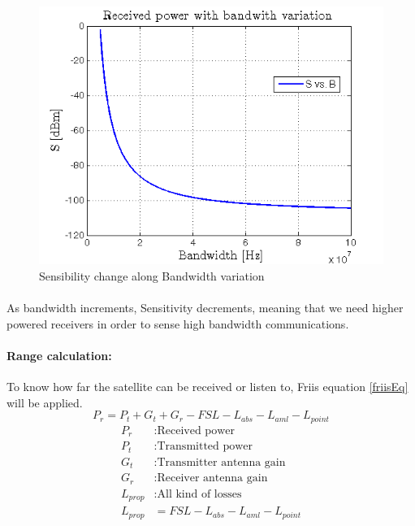 \begin{figure}[h]
	\includegraphics[scale=0.9]{./sections/SatelliteDept/sections/images/SvsB}
	\centering
	\caption{Sensibility change along Bandwidth variation}
	\label{SvsB}
\end{figure}

\paragraph{} As bandwidth increments, Sensitivity decrements, meaning that we need higher powered receivers in order to sense high bandwidth communications.
\paragraph{Range calculation:} To know how far the satellite can be received or listen to, Friis equation \ref{friisEq} will be applied. 
\begin{equation}
	P_r=P_t+G_t+G_r -FSL -L_{abs}-L_{aml}-L_{point}
	\label{friisEq}
\end{equation}
\begin{align*}
		P_r&:\text{Received power}\\
		P_t&:\text{Transmitted power}\\
		G_t&:\text{Transmitter antenna gain}\\
		G_r&:\text{Receiver antenna gain}\\
		L_{prop}&:\text{All kind of losses}\\
		L_{prop}&=FSL -L_{abs}-L_{aml}-L_{point}  	
\end{align*}

